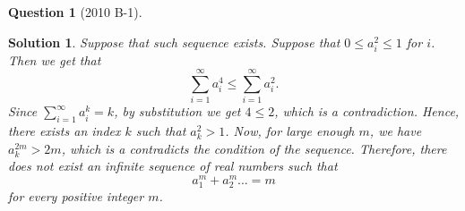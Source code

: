 \documentclass{article} %
\theoremstyle{quest}
\newtheorem*{question}{Question}
\newtheorem*{solution}{Solution}
\begin{document}
\begin{question}[2010 B-1]
\end{question}
\begin{solution}
Suppose that such sequence exists.
Suppose that $0 \leq a_i^2 \leq 1$ for $i$. Then we get that
\[
\sum_{i=1}^{\infty} a_i^4 \leq \sum_{i=1}^{\infty} a_i^2. 
\]
Since $\sum_{i=1}^{\infty} a_i^k = k$, by substitution we get $4 \leq 2$,
which is a contradiction. Hence, there exists an index $k$ such that $a_k^2 > 1$.
Now, for large enough $m$, we have $a_k^{2m} > 2m$, which is a contradicts the condition
of the sequence.
Therefore, there does not exist an infinite sequence of real numbers
such that 
\[
a_1^{m} + a_2^{m} ... = m
\]
for every positive integer $m$.
\end{solution}
\end{document}
